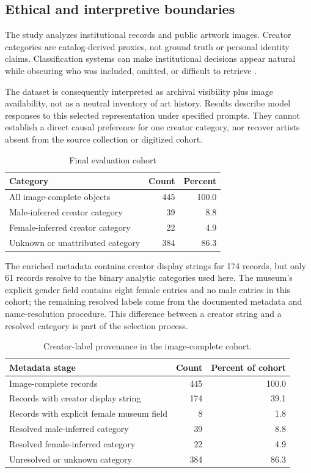 \documentclass[pdflatex,sn-basic,Numbered]{sn-jnl}
\begin{document}
\subsection{Ethical and interpretive boundaries}

The study analyzes institutional records and public artwork images. Creator categories are catalog-derived proxies, not ground truth or personal identity claims. Classification systems can make institutional decisions appear natural while obscuring who was included, omitted, or difficult to retrieve \cite{bowker2000sorting, noble2018algorithms, caswell2016archival}.

The dataset is consequently interpreted as archival visibility plus image availability, not as a neutral inventory of art history. Results describe model responses to this selected representation under specified prompts. They cannot establish a direct causal preference for one creator category, nor recover artists absent from the source collection or digitized cohort.

\begin{table}[htbp]
\centering
\caption{Final evaluation cohort}
\label{tab:cohort}
\begin{tabular}{lrr}
\toprule
Category & Count & Percent \\
\midrule
All image-complete objects & 445 & 100.0 \\
Male-inferred creator category & 39 & 8.8 \\
Female-inferred creator category & 22 & 4.9 \\
Unknown or unattributed category & 384 & 86.3 \\
\bottomrule
\end{tabular}
\end{table}

The enriched metadata contains creator display strings for 174 records, but only 61 records resolve to the binary analytic categories used here. The museum's explicit gender field contains eight female entries and no male entries in this cohort; the remaining resolved labels come from the documented metadata and name-resolution procedure. This difference between a creator string and a resolved category is part of the selection process.

\begin{table}[htbp]
\centering
\caption{Creator-label provenance in the image-complete cohort.}
\label{tab:labelprovenance}
\begin{tabular}{lrr}
\toprule
Metadata stage & Count & Percent of cohort \\
\midrule
Image-complete records & 445 & 100.0 \\
Records with creator display string & 174 & 39.1 \\
Records with explicit female museum field & 8 & 1.8 \\
Resolved male-inferred category & 39 & 8.8 \\
Resolved female-inferred category & 22 & 4.9 \\
Unresolved or unknown category & 384 & 86.3 \\
\bottomrule
\end{tabular}
\end{table}
\end{document}
